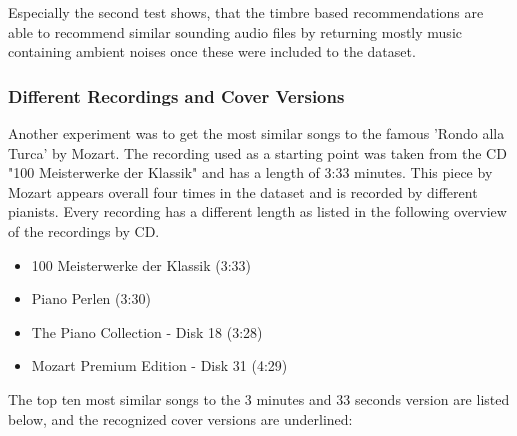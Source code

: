 \noindent Especially the second test shows, that the timbre based recommendations are able to recommend similar sounding audio files by returning mostly music containing ambient noises once these were included to the dataset.

\subsubsection{Different Recordings and Cover Versions}\label{covermfcc}
Another experiment was to get the most similar songs to the famous 'Rondo alla Turca' by Mozart.
The recording used as a starting point was taken from the CD "100 Meisterwerke der Klassik" and has a length of 3:33 minutes. This piece by Mozart appears overall four times in the dataset and is recorded by different pianists.
Every recording has a different length as listed in the following overview of the recordings by CD.

\begin{itemize}
	\setlength\itemsep{-0.5em}
	\item 100 Meisterwerke der Klassik (3:33)
	\item Piano Perlen (3:30)
	\item The Piano Collection - Disk 18 (3:28)
	\item Mozart Premium Edition - Disk 31 (4:29)
\end{itemize}

\noindent The top ten most similar songs to the 3 minutes and 33 seconds version are listed below, and the recognized cover versions are underlined:

